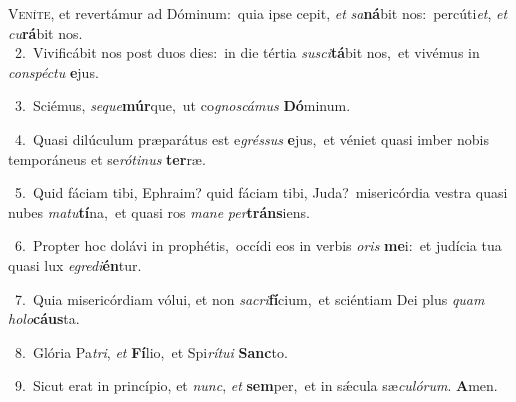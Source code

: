 \lettrine{\initial\textcolor{\initialcolor}{V}}{eníte,} et revertámur ad Dóminum:~\dagger quia ipse cepit, \textit{et} \textit{sa}\-\textbf{ná}bit nos:~\star percúti\-\textit{et}\-, \textit{et} \textit{cu}\-\textbf{rá}bit nos.\\
{\numbfont\textcolor{\numbcolor}{~2.}}~Vivificábit nos post duos dies:~\dagger in die tértia \textit{su}\-\textit{sci}\textbf{tá}bit nos,~\star et vivémus in \textit{con}\-\textit{spéc}\textit{tu} \textbf{e}\-jus.\par
{\numbfont\textcolor{\numbcolor}{~3.}}~Sciémus, \textit{se}\-\textit{que}\textbf{múr}que,~\star ut co\-\textit{gnos}\-\textit{cá}\textit{mus} \textbf{Dó}\-minum.\par
{\numbfont\textcolor{\numbcolor}{~4.}}~Quasi dilúculum præparátus est e\-\textit{grés}\-\textit{sus} \textbf{e}\-jus,~\star et véniet quasi imber nobis temporáneus et se\-\textit{ró}\-\textit{ti}\textit{nus} \textbf{ter}\-ræ.\par
{\numbfont\textcolor{\numbcolor}{~5.}}~Quid fáciam tibi, Ephraim? quid fáciam tibi, Juda?~\dagger misericórdia vestra quasi nubes \textit{ma}\-\textit{tu}\textbf{tí}na,~\star et quasi ros \textit{ma}\-\textit{ne} \textit{per}\-\textbf{tráns}iens.\par
{\numbfont\textcolor{\numbcolor}{~6.}}~Propter hoc dolávi in prophétis,~\dagger occídi eos in verbis \textit{o}\-\textit{ris} \textbf{me}\-i:~\star et judícia tua quasi lux \textit{e}\-\textit{gre}\textit{di}\textbf{én}tur.\par
{\numbfont\textcolor{\numbcolor}{~7.}}~Quia misericórdiam vólui, et non \textit{sa}\-\textit{cri}\textbf{fí}cium,~\star et sciéntiam Dei plus \textit{quam} \textit{ho}\-\textit{lo}\textbf{cáus}ta.\par
{\numbfont\textcolor{\numbcolor}{~8.}}~Glória Pa\-\textit{tri}\-, \textit{et} \textbf{Fí}\-lio,~\star et Spi\-\textit{rí}\-\textit{tu}\textit{i} \textbf{Sanc}\-to.\par
{\numbfont\textcolor{\numbcolor}{~9.}}~Sicut erat in princípio, et \textit{nunc}\-, \textit{et} \textbf{sem}\-per,~\star et in sǽcula sæ\-\textit{cu}\-\textit{ló}\textit{rum}. \textbf{A}\-men.\par
